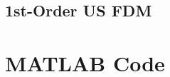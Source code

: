 \documentclass[10pt, reqno]{article}		%
\numberwithin{equation}{section}
\begin{document}


\newline


\newline


\newpage

\subsection{1st-Order US FDM}



\newline


\newline


\newpage

\section{MATLAB Code}
\end{document}
